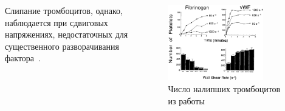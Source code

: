 \documentclass[
    14pt,
    xcolor=dvipsnames,
    aspectratio=169
]{beamer}
\begin{document}
\begin{frame}{\subsecname}
    \begin{columns}[T]
        \begin{column}{0.4\textwidth}
            Слипание тромбоцитов, однако, наблюдается при сдвиговых напряжениях,
            недостаточных для существенного разворачивания фактора~\cite{savage1996platelet_adhesion, rahman2019platelet_adhesion}.
        \end{column}

        \begin{column}{0.6\textwidth}
            \begin{figure}[ht!]
                \centering
                \includegraphics[width=0.8\textwidth]{./images/slides/Savage_platelets.png}
                \caption{Число налипших тромбоцитов из работы \textcite{savage1996platelet_adhesion}}
            \end{figure}
        \end{column}
    \end{columns}
\end{frame}

\end{document}
